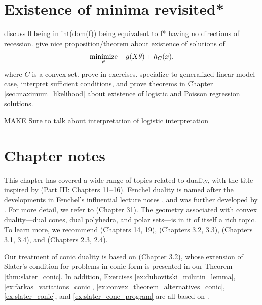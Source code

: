 \section{Existence of minima revisited*}
\label{sec:existence_minima_revisited}

discuss 0 being in int(dom(f)) being equivalent to f* having no directions
of recession.  give nice proposition/theorem about existence of solutions of 
$$
\operatorname*{minimize}_\theta \quad g(X \theta) + h_C(x),
$$
where $C$ is a convex set. prove in exercises. specialize to generalized linear
model case, interpret sufficient conditions, and prove theorems in Chapter
\ref{sec:maximum_likelihood} about existence of logistic and Poisson regression
solutions. 


MAKE Sure to talk about interpretation of logistic interpretation

\SkipTocEntry\section*{Chapter notes}

This chapter has covered a wide range of topics related to duality, with the
title inspired by \cite{rockafellar1970convex} (Part III: Chapters 11--16). 
Fenchel duality is named after the developments in Fenchel's influential lecture
notes \cite{fenchel1951convex}, and was further developed by
\cite{rockafellar1963convex}. For more detail, we refer to
\cite{rockafellar1970convex} (Chapter 31). The geometry associated with convex 
duality---dual cones, dual polyhedra, and polar sets---is in it of itself a rich
topic. To learn more, we recommend \cite{rockafellar1970convex} (Chapters 14,
19), \cite{bertsekas2009convex} (Chapters 3.2, 3.3), \cite{grunbaum2003convex}  
(Chapters 3.1, 3.4), and \cite{ziegler1995lectures} (Chapters 2.3, 2.4).       

Our treatment of conic duality is based on \cite{bental2023convex} (Chapter
3.2), whose extension of Slater's condition for problems in conic form is
presented in our Theorem \ref{thm:slater_conic}. In addition, Exercises
\ref{ex:dubovitski_milutin_lemma}, \ref{ex:farkas_variations_conic}, 
\ref{ex:convex_theorem_alternatives_conic}, \ref{ex:slater_conic}, and   
\ref{ex:slater_cone_program} are all based on \cite{bental2023convex}. 

\clearpage

